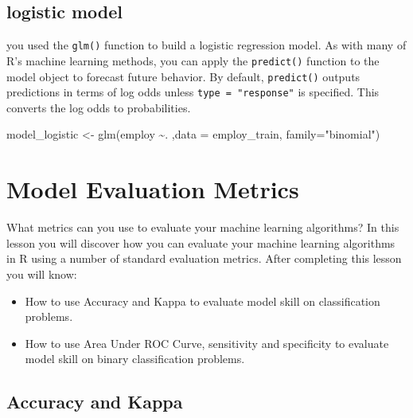 \documentclass[
]{book}
\newenvironment{Shaded}{\begin{snugshade}}{\end{snugshade}}
\newcommand{\AttributeTok}[1]{\textcolor[rgb]{0.77,0.63,0.00}{#1}}
\newcommand{\FunctionTok}[1]{\textcolor[rgb]{0.00,0.00,0.00}{#1}}
\newcommand{\NormalTok}[1]{#1}
\newcommand{\OtherTok}[1]{\textcolor[rgb]{0.56,0.35,0.01}{#1}}
\newcommand{\SpecialCharTok}[1]{\textcolor[rgb]{0.00,0.00,0.00}{#1}}
\newcommand{\StringTok}[1]{\textcolor[rgb]{0.31,0.60,0.02}{#1}}
\providecommand{\tightlist}{%
  \setlength{\itemsep}{0pt}\setlength{\parskip}{0pt}}
\begin{document}
\hypertarget{logistic-model}{%
\subsection{logistic model}\label{logistic-model}}

you used the \texttt{glm()} function to build a logistic regression model. As with many of R's machine learning methods, you can apply the \texttt{predict()} function to the model object to forecast future behavior. By default, \texttt{predict()} outputs predictions in terms of log odds unless \texttt{type\ =\ "response"} is specified. This converts the log odds to probabilities.

\begin{Shaded}
\begin{Highlighting}[]
\NormalTok{model\_logistic }\OtherTok{\textless{}{-}} \FunctionTok{glm}\NormalTok{(employ }\SpecialCharTok{\textasciitilde{}}\NormalTok{. ,}\AttributeTok{data =}\NormalTok{ employ\_train, }
                      \AttributeTok{family=}\StringTok{"binomial"}\NormalTok{)}
\end{Highlighting}
\end{Shaded}

\hypertarget{model-evaluation-metrics}{%
\section{Model Evaluation Metrics}\label{model-evaluation-metrics}}

What metrics can you use to evaluate your machine learning algorithms? In this lesson you will discover how you can evaluate your machine learning algorithms in R using a number of standard evaluation metrics. After completing this lesson you will know:

\begin{itemize}
\tightlist
\item
  How to use Accuracy and Kappa to evaluate model skill on classification problems.
\item
  How to use Area Under ROC Curve, sensitivity and specificity to evaluate model skill on binary classification problems.
\end{itemize}

\hypertarget{accuracy-and-kappa}{%
\subsection{Accuracy and Kappa}\label{accuracy-and-kappa}}
\end{document}
